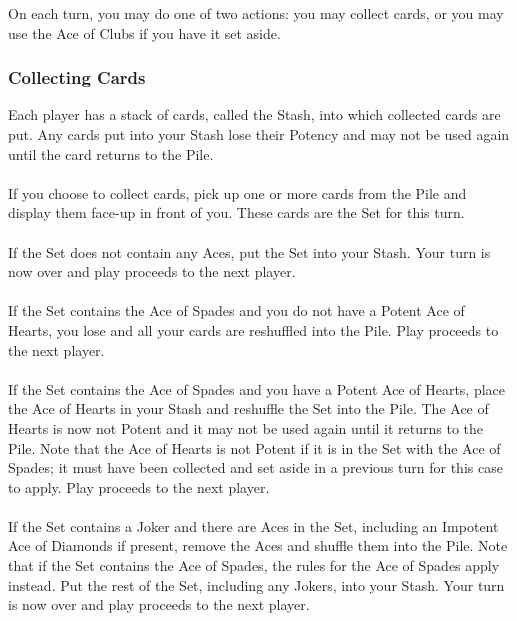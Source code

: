 \documentclass{article}
\begin{document}
On each turn, you may do one of two actions: you may collect cards, or
you may use the Ace of Clubs if you have it set aside.

\subsubsection{Collecting Cards \label{sec:collecting}}


Each player has a stack of cards, called the Stash, into which collected
cards are put. Any cards put into your Stash lose their Potency and may
not be used again until the card returns to the Pile.

\paragraph{\label{par:set}}

If you choose to collect cards, pick up one or more cards from the Pile
and display them face-up in front of you. These cards are the Set for
this turn.

\paragraph{\label{par:setnoace}}
If the Set does not contain any Aces, put the Set into your Stash.
Your turn is now over and play proceeds to the next player. 

\paragraph{\label{par:setspadenoheart}}
If the Set contains the Ace of Spades and you do not have a Potent Ace
of Hearts, you lose and all your cards are reshuffled into the Pile.
Play proceeds to the next player.

\paragraph{\label{par:spadeshearts}}
If the Set contains the Ace of Spades and you have a Potent Ace of
Hearts, place the Ace of Hearts in your Stash and reshuffle the Set into
the Pile. The Ace of Hearts is now not Potent and it may not be used
again until it returns to the Pile. Note that the Ace of Hearts is not
Potent if it is in the Set with the Ace of Spades; it must have been
collected and set aside in a previous turn for this case to apply. Play
proceeds to the next player.

\paragraph{\label{par:jokersetaces}}
If the Set contains a Joker and there are Aces in the Set, including an
Impotent Ace of Diamonds if present, remove the Aces and shuffle them into the
Pile. Note that if the Set contains the Ace of Spades, the rules for the Ace of
Spades apply instead. Put the rest of the Set, including any Jokers, into your
Stash. Your turn is now over and play proceeds to the next player.
\end{document}
